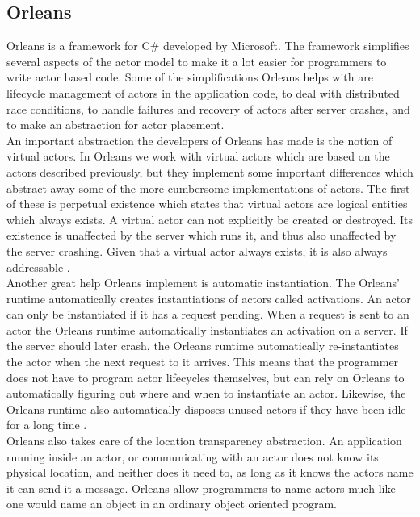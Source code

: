 \subsection{Orleans}
Orleans is a framework for C\# developed by Microsoft. The framework simplifies several aspects of the actor model to make it a lot easier for programmers to write actor based code. Some of the simplifications Orleans helps with are lifecycle management of actors in the application code, to deal with distributed race conditions, to handle failures and recovery of actors after server crashes, and to make an abstraction for actor placement.\\
An important abstraction the developers of Orleans has made is the notion of virtual actors. In Orleans we work with virtual actors which are based on the actors described previously, but they implement some important differences which abstract away some of the more cumbersome implementations of actors. The first of these is perpetual existence which states that virtual actors are logical entities which always exists. A virtual actor can not explicitly be created or destroyed. Its existence is unaffected by the server which runs it, and thus also unaffected by the server crashing. Given that a virtual actor always exists, it is also always addressable \cite{OrleansPaper}.\\
Another great help Orleans implement is automatic instantiation. The Orleans' runtime automatically creates instantiations of actors called activations. An actor can only be instantiated if it has a request pending. When a request is sent to an actor the Orleans runtime automatically instantiates an activation on a server. If the server should later crash, the Orleans runtime automatically re-instantiates the actor when the next request to it arrives. This means that the programmer does not have to program actor lifecycles themselves, but can rely on Orleans to automatically figuring out where and when to instantiate an actor. Likewise, the Orleans runtime also automatically disposes unused actors if they have been idle for a long time \cite{OrleansPaper}.\\
Orleans also takes care of the location transparency abstraction. An application running inside an actor, or communicating with an actor does not know its physical location, and neither does it need to, as long as it knows the actors name it can send it a message. Orleans allow programmers to name actors much like one would name an object in an ordinary object oriented program.\\
